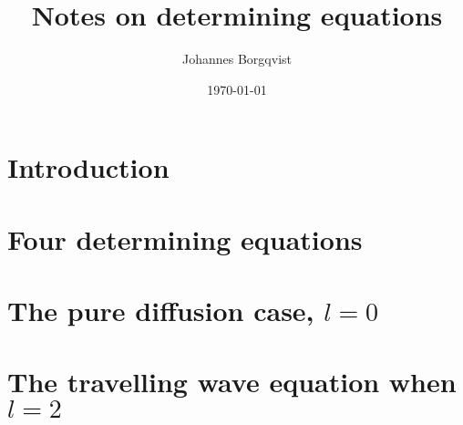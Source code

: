 \documentclass[a4paper,12pt]{article}
\title{Notes on determining equations}
\author{Johannes Borgqvist}
\date{\today}
\begin{document}
\maketitle
\tableofcontents
\section{Introduction}


  
\section{Four determining equations}


\section{The pure diffusion case, $l=0$}


\section{The travelling wave equation when $l=2$}

\end{document}
